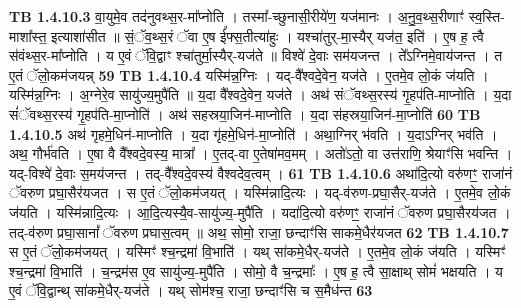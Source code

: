 \documentclass[17pt]{extarticle}
\begin{document}
                  \newline
                                \textbf{ TB 1.4.10.3} \newline
                  वा॒युमे॒व तद॑नुवथ्स॒र-मा᳚प्नोति । तस्मा᳚-च्छुनासी॒रीये॑ण॒ यज॑मानः । अ॒नु॒व॒थ्स॒रीणाꣳ॑ स्व॒स्ति-माशा᳚स्त॒ इत्याशा॑सीत ॥ सं॒ॅव॒थ्स॒रं ॅवा ए॒ष ई᳚फ्स॒तीत्या॑हुः । यश्चा॑तुर्-मा॒स्यैर् यज॑त॒ इति॑ । ए॒ष ह॒ त्वै स॑वंथ्स॒र-मा᳚प्नोति । य ए॒वं ॅवि॒द्वाꣳ श्चा॑तुर्मा॒स्यैर्-यज॑ते ॥ विश्वे॑ दे॒वाः सम॑यजन्त । ते᳚ऽग्निमे॒वाय॑जन्त । त ए॒तं ॅलो॒कम॑जयन्न् \textbf{ 59} \newline
                  \newline
                                \textbf{ TB 1.4.10.4} \newline
                  यस्मि॑न्न॒ग्निः । यद्-वै᳚श्वदे॒वेन॒ यज॑ते । ए॒तमे॒व लो॒कं ज॑यति । यस्मि॑न्न॒ग्निः । अ॒ग्नेरे॒व सायु॑ज्य॒मुपै॑ति ॥ य॒दा वै᳚श्वदे॒वेन॒ यज॑ते । अथ॑ संॅवथ्स॒रस्य॑ गृ॒हप॑ति-माप्नोति । य॒दा सं॑ॅवथ्स॒रस्य॑ गृ॒हप॑ति-मा॒प्नोति॑ । अथ॑ सहस्रया॒जिन॑-माप्नोति । य॒दा स॑हस्रया॒जिन॑-मा॒प्नोति॑ \textbf{ 60} \newline
                  \newline
                                \textbf{ TB 1.4.10.5} \newline
                  अथ॑ गृहमे॒धिन॑-माप्नोति । य॒दा गृ॑हमे॒धिन॑-मा॒प्नोति॑ । अथा॒ग्निर् भ॑वति । य॒दाऽग्निर् भव॑ति । अथ॒ गौर्भ॑वति । ए॒षा वै वै᳚श्वदे॒वस्य॒ मात्रा᳚ । ए॒तद्-वा ए॒तेषा॑मव॒मम् । अतो॑ऽतो॒ वा उत्त॑राणि॒ श्रेयाꣳ॑सि भवन्ति । यद्-विश्वे॑ दे॒वाः स॒मय॑जन्त । तद्-वै᳚श्वदे॒वस्य॑ वैश्वदेव॒त्वम् । \textbf{ 61} \newline
                  \newline
                                \textbf{ TB 1.4.10.6} \newline
                  अथा॑दि॒त्यो वरु॑णꣳ॒॒ राजा॑नं ॅवरुण प्रघा॒सैर॑यजत । स ए॒तं ॅलो॒कम॑जयत् । यस्मि॑न्नादि॒त्यः । यद्-व॑रुण-प्रघा॒सैर्-यज॑ते । ए॒तमे॒व लो॒कं ज॑यति । यस्मि॑न्नादि॒त्यः । आ॒दि॒त्यस्यै॒व-सायु॑ज्य॒-मुपै॑ति । यदा॑दि॒त्यो वरु॑णꣳ॒॒ राजा॑नं ॅवरुण प्रघा॒सैरय॑जत । तद्-व॑रुण प्रघा॒सानां᳚ ॅवरुण प्रघास॒त्वम् ॥ अथ॒ सोमो॒ राजा॒ छन्दाꣳ॑सि साकमे॒धैर॑यजत \textbf{ 62} \newline
                  \newline
                                \textbf{ TB 1.4.10.7} \newline
                  स ए॒तं ॅलो॒कम॑जयत् । यस्मिꣳ॑ श्च॒न्द्रमा॑ वि॒भाति॑ । यथ् सा॑कमे॒धैर्-यज॑ते । ए॒तमे॒व लो॒कं ज॑यति । यस्मिꣳ॑ श्च॒न्द्रमा॑ वि॒भाति॑ । च॒न्द्रम॑स ए॒व सायु॑ज्य॒-मुपै॑ति । सोमो॒ वै च॒न्द्रमाः᳚ । ए॒ष ह॒ त्वै सा॒क्षाथ् सोमं॑ भक्षयति । य ए॒वं ॅवि॒द्वान्थ् सा॑कमे॒धैर्-यज॑ते । यथ् सोम॑श्च॒ राजा॒ छन्दाꣳ॑सि च स॒मैध॑न्त \textbf{ 63} \newline
\end{document}
